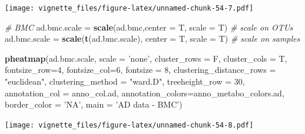 \documentclass[]{book}
\newenvironment{Shaded}{\begin{snugshade}}{\end{snugshade}}
\newcommand{\KeywordTok}[1]{\textcolor[rgb]{0.13,0.29,0.53}{\textbf{#1}}}
\newcommand{\DataTypeTok}[1]{\textcolor[rgb]{0.13,0.29,0.53}{#1}}
\newcommand{\DecValTok}[1]{\textcolor[rgb]{0.00,0.00,0.81}{#1}}
\newcommand{\StringTok}[1]{\textcolor[rgb]{0.31,0.60,0.02}{#1}}
\newcommand{\CommentTok}[1]{\textcolor[rgb]{0.56,0.35,0.01}{\textit{#1}}}
\newcommand{\NormalTok}[1]{#1}
\begin{document}
\texttt{[image: vignette\_files/figure-latex/unnamed-chunk-54-7.pdf]}

\begin{Shaded}
\begin{Highlighting}[]
\CommentTok{# BMC}
\NormalTok{ad.bmc.scale =}\StringTok{ }\KeywordTok{scale}\NormalTok{(ad.bmc,}\DataTypeTok{center =}\NormalTok{ T, }\DataTypeTok{scale =}\NormalTok{ T) }\CommentTok{# scale on OTUs}
\NormalTok{ad.bmc.scale =}\StringTok{ }\KeywordTok{scale}\NormalTok{(}\KeywordTok{t}\NormalTok{(ad.bmc.scale), }\DataTypeTok{center =}\NormalTok{ T, }\DataTypeTok{scale =}\NormalTok{ T) }\CommentTok{# scale on samples}

\KeywordTok{pheatmap}\NormalTok{(ad.bmc.scale, }
         \DataTypeTok{scale =} \StringTok{'none'}\NormalTok{, }
         \DataTypeTok{cluster_rows =}\NormalTok{ F, }
         \DataTypeTok{cluster_cols =}\NormalTok{ T, }
         \DataTypeTok{fontsize_row=}\DecValTok{4}\NormalTok{, }\DataTypeTok{fontsize_col=}\DecValTok{6}\NormalTok{,}
         \DataTypeTok{fontsize =} \DecValTok{8}\NormalTok{,}
         \DataTypeTok{clustering_distance_rows =} \StringTok{"euclidean"}\NormalTok{,}
         \DataTypeTok{clustering_method =} \StringTok{"ward.D"}\NormalTok{,}
         \DataTypeTok{treeheight_row =} \DecValTok{30}\NormalTok{,}
         \DataTypeTok{annotation_col =}\NormalTok{ anno_col.ad,}
         \DataTypeTok{annotation_colors=}\NormalTok{anno_metabo_colors.ad,}
         \DataTypeTok{border_color =} \StringTok{'NA'}\NormalTok{,}
         \DataTypeTok{main =} \StringTok{'AD data - BMC'}\NormalTok{)}
\end{Highlighting}
\end{Shaded}

\texttt{[image: vignette\_files/figure-latex/unnamed-chunk-54-8.pdf]}
\end{document}
